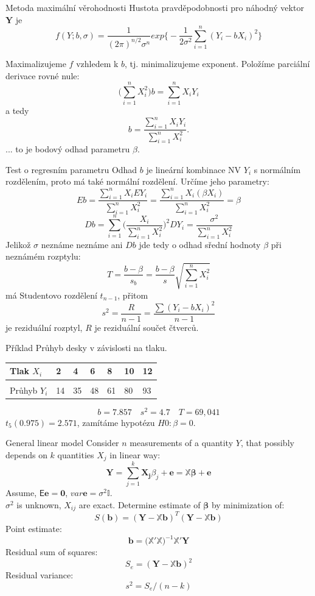\documentclass[smaller]{beamer}
\def\vc#1{\mathbf{\boldsymbol{#1}}}     %
\def\tn#1{{\mathbb{#1}}}    %
\def\E{\vc{\mathsf{E}}}
\begin{document}
\begin{frame}{Metoda maximální věrohodnosti}
 Hustota pravděpodobnosti pro náhodný vektor $\vc Y$ je
  \[
   f(Y;b,\sigma) = \frac{1}{(2\pi)^{n/2}\sigma^n} exp\Big\{ -\frac{1}{2\sigma^2} \sum_{i=1}^{n} (Y_i - b X_i)^2 \Big\}
 \]

 Maximalizujeme $f$ vzhledem k $b$, tj. minimalizujeme exponent. 
 Položíme parciální derivace rovné nule:
 \[
    \big(\sum_{i=1}^n X_i^2\big) b = \sum_{i=1}^n X_iY_i 
 \]
 a tedy 
\[ 
   b = \frac{\sum_{i=1}^n X_iY_i}{\sum_{i=1}^n X_i^2}.
\]
... to je bodový odhad parametru $\beta$.
\end{frame}

\begin{frame}{Test o regresním parametru}
Odhad $b$ je lineární kombinace NV $Y_i$ s normálním rozdělením, proto má také normální rozdělení. Určíme jeho parametry:
\[
 E b = \frac{\sum_{i=1}^n X_i E Y_i}{\sum_{i=1}^n X_i^2} = \frac{\sum_{i=1}^n X_i (\beta X_i)}{\sum_{i=1}^n X_i^2} =\beta
\]
\[
 D b = \sum_{i=1}^n \Big(\frac{X_i}{\sum_{i=1}^n X_i^2}\Big)^2 D Y_i = \frac{\sigma^2}{{\sum_{i=1}^n X_i^2}}
\]
Jelikož $\sigma$ neznáme neznáme ani $D b$ jde tedy o odhad sřední hodnoty $\beta$ při neznámém rozptylu:
\[
 T = \frac{b-\beta}{s_b} = \frac{b - \beta}{s} \sqrt{\sum_{i=1}^n X_i^2}
\]
má Studentovo rozdělení $t_{n-1}$, přitom
\[
 s^2 = \frac{R}{n-1} = \frac{\sum (Y_i - b X_i)^2}{n-1}
\]
je reziduální rozptyl, $R$ je reziduální součet čtverců. 
\end{frame}


\begin{frame}{Příklad}
 Průhyb desky v závislosti na tlaku.
\begin{center}
\begin{tabular}{l|llllll}
Tlak $X_i$ & 2 & 4 & 6 & 8 & 10 & 12\\
\hline\\
Průhyb $Y_i$ & 14 & 35 & 48 & 61 & 80 & 93\\
\end{tabular}
\end{center}

\[
  b = 7.857\quad s^2 = 4.7\quad T = 69,041
\]
$t_5(0.975) = 2.571$, zamítáme hypotézu $H0: \beta = 0$. 

\end{frame}

\begin{frame}{General linear model}
Consider $n$ measurements of a quantity $Y$, that possibly depends on $k$ quantities $X_j$  in linear way:
\[
   \vc{Y} = \sum_{j=1}^k \vc{X_j} \beta_j + \vc{e} = \tn X \vc{\beta} + \vc e
\]
Assume, $\E \vc e = \vc 0$, $var \vc e = \sigma^2 \tn I$. \\
$\sigma^2$ is unknown, $X_{ij}$ are exact.
Determine estimate of $\vc \beta$ by minimization of:
\[
   S(\vc b) = (\vc Y -\tn X\vc b)^T (\vc Y - \tn X\vc b)
\]
Point estimate:
\[
    \vc b = \big( \tn X' \tn X \big)^{-1} \tn X' \vc Y
\]
Residual sum of squares:
\[
    S_e=(\vc Y -\tn X \vc b)^2
\]
Residual variance:
\[
 s^2 = S_e/(n-k) 
\]

\end{frame}
\end{document}
